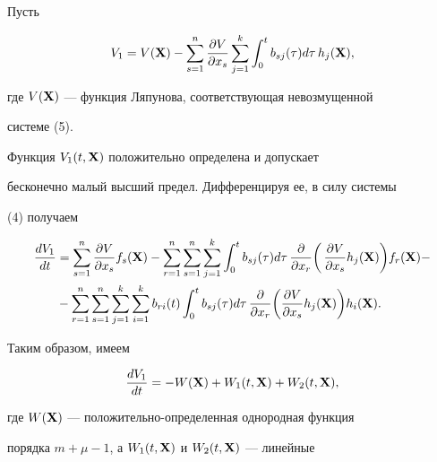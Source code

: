  


\begin{pf} Пусть 


\begin{equation} 


V_1=V(\bx)-\sum^n_{s=1} 


\frac{\partial V}{\partial x_s}\sum^k_{j=1} 


\int^t_0 b_{sj}(\tau)d\tau\,h_j(\bx), 


\end{equation} 


где $V(\bold X)$ --- функция Ляпунова, соответствующая невозмущенной 


системе (5). 


 


Функция $V_1(t,\bold X)$ положительно определена и допускает 


бесконечно малый высший предел. Дифференцируя ее, в силу системы 


(4) получаем 


\begin{align*} 


\frac{dV_1}{dt}&=\sum^n_{s=1} 


\frac{\partial V}{\partial x_s}f_s(\bx)-\sum^n_{r=1} 


\sum^n_{s=1}\sum^k_{j=1}\int^t_0 b_{sj}(\tau)d\tau\, 


\frac{\partial}{\partial x_r}\biggl(\, 


\frac{\partial V}{\partial x_s}h_j(\bx)\biggr)f_r(\bx)-\\ 


&- \sum^n_{r=1}\sum^n_{s=1}\sum^k_{j=1}\sum^k_{i=1} 


b_{ri}(t)\int^t_0 b_{sj}(\tau)d\tau\, 


\frac{\partial}{\partial x_r}\biggl( 


\frac{\partial V}{\partial x_s}h_j(\bx)\biggr)h_i(\bx). 


\end{align*} 


Таким образом, имеем 


\begin{equation} 


\frac{dV_1}{dt}=-W(\bx)+W_1(t,\bx)+W_2(t,\bx), 


\end{equation} 


где $W(\bold X)$ --- положительно-определенная однородная функция 


порядка $m+\mu-1$, а $W_1(t,\bold X)$ и $W_2(t,\bold X)$ --- линейные 



\end{pf}
